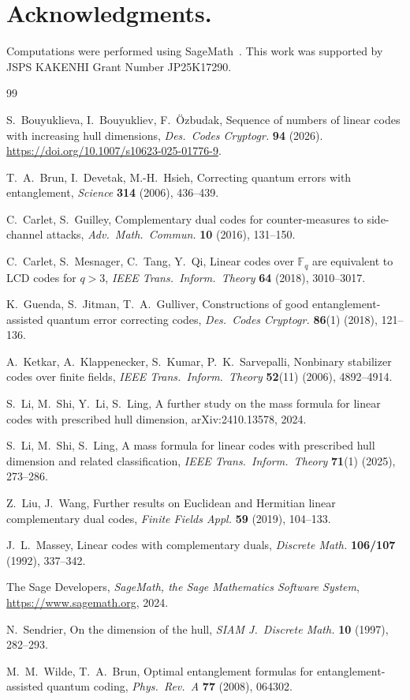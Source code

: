 \documentclass[11pt]{article}
\theoremstyle{plain}
\theoremstyle{remark}
\begin{document}
\section*{Acknowledgments.}
Computations were performed using SageMath~\cite{SageMath}.
This work was supported by JSPS KAKENHI Grant Number JP25K17290.

\begin{thebibliography}{99}

S.~Bouyuklieva, I.~Bouyukliev, F.~\"Ozbudak,
Sequence of numbers of linear codes with increasing hull dimensions,
\textit{Des.\ Codes Cryptogr.} \textbf{94} (2026).
\url{https://doi.org/10.1007/s10623-025-01776-9}.

T.~A.~Brun, I.~Devetak, M.-H.~Hsieh,
Correcting quantum errors with entanglement,
\textit{Science} \textbf{314} (2006), 436--439.

C.~Carlet, S.~Guilley,
Complementary dual codes for counter-measures to side-channel attacks,
\textit{Adv.\ Math.\ Commun.} \textbf{10} (2016), 131--150.

C.~Carlet, S.~Mesnager, C.~Tang, Y.~Qi,
Linear codes over $\mathbb{F}_q$ are equivalent to LCD codes for $q > 3$,
\textit{IEEE Trans.\ Inform.\ Theory} \textbf{64} (2018), 3010--3017.

K.~Guenda, S.~Jitman, T.~A.~Gulliver,
Constructions of good entanglement-assisted quantum error correcting codes,
\textit{Des.\ Codes Cryptogr.} \textbf{86}(1) (2018), 121--136.

A.~Ketkar, A.~Klappenecker, S.~Kumar, P.~K.~Sarvepalli,
Nonbinary stabilizer codes over finite fields,
\textit{IEEE Trans.\ Inform.\ Theory} \textbf{52}(11) (2006), 4892--4914.

S.~Li, M.~Shi, Y.~Li, S.~Ling,
A further study on the mass formula for linear codes with prescribed hull dimension,
arXiv:2410.13578, 2024.

S.~Li, M.~Shi, S.~Ling,
A mass formula for linear codes with prescribed hull dimension and related classification,
\textit{IEEE Trans.\ Inform.\ Theory} \textbf{71}(1) (2025), 273--286.

Z.~Liu, J.~Wang,
Further results on Euclidean and Hermitian linear complementary dual codes,
\textit{Finite Fields Appl.} \textbf{59} (2019), 104--133.

J.~L.~Massey,
Linear codes with complementary duals,
\textit{Discrete Math.} \textbf{106/107} (1992), 337--342.

The Sage Developers,
\textit{SageMath, the Sage Mathematics Software System},
\url{https://www.sagemath.org}, 2024.

N.~Sendrier,
On the dimension of the hull,
\textit{SIAM J.\ Discrete Math.} \textbf{10} (1997), 282--293.

M.~M.~Wilde, T.~A.~Brun,
Optimal entanglement formulas for entanglement-assisted quantum coding,
\textit{Phys.\ Rev.\ A} \textbf{77} (2008), 064302.

\end{thebibliography}
\end{document}
